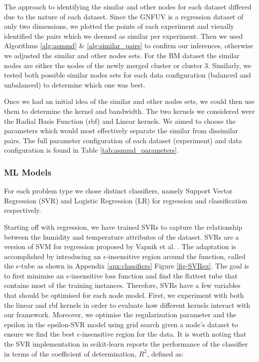 \documentclass{mpaper}
\begin{document}
The approach to identifying the similar and other nodes for each dataset differed due to the nature of each dataset. Since the GNFUV is a regression dataset of only two dimensions, we plotted the points of each experiment and visually identified the pairs which we deemed as similar per experiment. Then we used Algorithms \ref{alg:asmmd} \& \ref{alg:similar_pairs} to confirm our inferences, otherwise we adjusted the similar and other nodes sets. For the BM dataset the similar nodes are either the nodes of the newly merged cluster or cluster 3. Similarly, we tested both possible similar nodes sets for each data configuration (balanced and unbalanced) to determine which one was best. 

Once we had an initial idea of the similar and other nodes sets, we could then use them to determine the kernel and bandwidth.  The two kernels we considered were the Radial Basis Function (rbf) and Linear kernels. We aimed to choose the parameters which would most effectively separate the similar from dissimilar pairs. The full parameter configuration of each dataset (experiment) and data configuration is found in Table \ref{tab:asmmd_parameters}.


\subsubsection{ML Models}

For each problem type we chose distinct classifiers, namely Support Vector Regression (SVR) and Logistic Regression (LR) for regression and classification respectively.

Starting off with regression, we have trained SVRs to capture the relationship between the humidity and temperature attributes of the dataset. SVRs are a version of SVM for regression proposed by Vapnik et al. \cite{OriginalSVR}. The adaptation is accomplished by introducing an $\epsilon$-insensitive region around the function, called the $\epsilon$-tube as shown in Appendix \ref{apx:classifiers} Figure \ref{fig-SVRex}. The goal is to first minimise an $\epsilon$-insensitive loss function and find the flattest tube that contains most of the training instances. Therefore, SVRs have a few variables that should be optimised for each node model. First, we experiment with both the linear and rbf kernels in order to evaluate how different kernels interact with our framework. Moreover, we optimise the regularization parameter and the epsilon in the epsilon-SVR model using grid search given a node's dataset to ensure we find the best $\epsilon$-insensitive region for the data. It is worth noting that the SVR implementation in scikit-learn reports the performance of the classifier in terms of the coefficient of determination, $R^2$, defined as:
\end{document}
